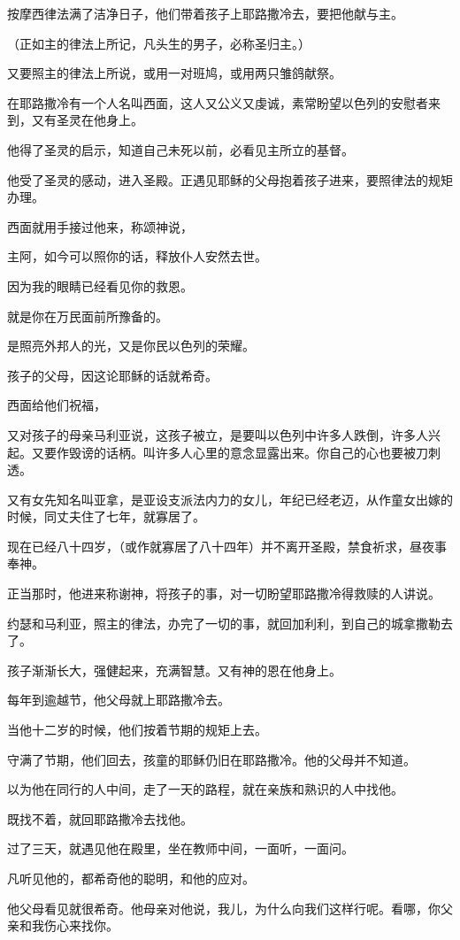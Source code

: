 \documentclass[12pt,oneside]{book}
\begin{document}
按摩西律法满了洁净日子，他们带着孩子上耶路撒冷去，要把他献与主。

（正如主的律法上所记，凡头生的男子，必称圣归主。）

又要照主的律法上所说，或用一对班鸠，或用两只雏鸽献祭。

在耶路撒冷有一个人名叫西面，这人又公义又虔诚，素常盼望以色列的安慰者来到，又有圣灵在他身上。

他得了圣灵的启示，知道自己未死以前，必看见主所立的基督。

他受了圣灵的感动，进入圣殿。正遇见耶稣的父母抱着孩子进来，要照律法的规矩办理。

西面就用手接过他来，称颂神说，

主阿，如今可以照你的话，释放仆人安然去世。

因为我的眼睛已经看见你的救恩。

就是你在万民面前所豫备的。

是照亮外邦人的光，又是你民以色列的荣耀。

孩子的父母，因这论耶稣的话就希奇。

西面给他们祝福，

又对孩子的母亲马利亚说，这孩子被立，是要叫以色列中许多人跌倒，许多人兴起。又要作毁谤的话柄。叫许多人心里的意念显露出来。你自己的心也要被刀刺透。

又有女先知名叫亚拿，是亚设支派法内力的女儿，年纪已经老迈，从作童女出嫁的时候，同丈夫住了七年，就寡居了。

现在已经八十四岁，（或作就寡居了八十四年）并不离开圣殿，禁食祈求，昼夜事奉神。

正当那时，他进来称谢神，将孩子的事，对一切盼望耶路撒冷得救赎的人讲说。

约瑟和马利亚，照主的律法，办完了一切的事，就回加利利，到自己的城拿撒勒去了。

孩子渐渐长大，强健起来，充满智慧。又有神的恩在他身上。

每年到逾越节，他父母就上耶路撒冷去。

当他十二岁的时候，他们按着节期的规矩上去。

守满了节期，他们回去，孩童的耶稣仍旧在耶路撒冷。他的父母并不知道。

以为他在同行的人中间，走了一天的路程，就在亲族和熟识的人中找他。

既找不着，就回耶路撒冷去找他。

过了三天，就遇见他在殿里，坐在教师中间，一面听，一面问。

凡听见他的，都希奇他的聪明，和他的应对。

他父母看见就很希奇。他母亲对他说，我儿，为什么向我们这样行呢。看哪，你父亲和我伤心来找你。
\end{document}
